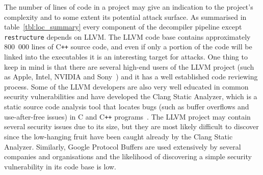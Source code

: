 The number of lines of code in a project may give an indication to the project's complexity and to some extent its potential attack surface. As summarised in table~\ref{tbl:loc_summary} every component of the decompiler pipeline except \texttt{restructure} depends on LLVM. The LLVM code base contains approximately 800~000 lines of C\texttt{++} source code, and even if only a portion of the code will be linked into the executables it is an interesting target for attacks. One thing to keep in mind is that there are several high-end users of the LLVM project (such as Apple, Intel, NVIDIA and Sony~\cite{llvm_users}) and it has a well established code reviewing process. Some of the LLVM developers are also very well educated in common security vulnerabilities and have developed the Clang Static Analyzer, which is a static source code analysis tool that locates bugs (such as buffer overflows and use-after-free issues) in C and C\texttt{++} programs~\cite{clang_analyzer}. The LLVM project may contain several security issues due to its size, but they are most likely difficult to discover since the low-hanging fruit have been caught already by the Clang Static Analyzer. Similarly, Google Protocol Buffers are used extensively by several companies and organisations and the likelihood of discovering a simple security vulnerability in its code base is low.

